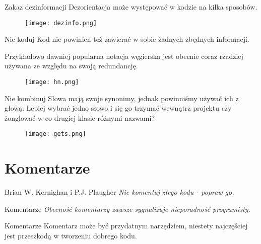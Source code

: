 \begin{frame}{Zakaz dezinformacji}
	Dezorientacja może występować w kodzie na kilka sposobów.
\end{frame}

\begin{frame}
	\begin{figure} \centering
		\texttt{[image: dezinfo.png]}
	\end{figure}
\end{frame}

\begin{frame}{Nie koduj}
	Kod nie powinien też zawierać w sobie żadnych zbędnych informacji.
	
	Przykładowo dawniej popularna notacja węgierska jest obecnie coraz rzadziej używana ze względu na swoją redundancję.
\end{frame}

\begin{frame}
	\begin{figure} \centering
		\texttt{[image: hn.png]}
	\end{figure}
\end{frame}

\begin{frame}{Nie kombinuj}
	Słowa mają swoje synonimy, jednak powinniśmy używać ich z głową. Lepiej wybrać jedno słowo i się go trzymać wewnątrz projektu czy żonglować w co drugiej klasie różnymi nazwami?
\end{frame}

\begin{frame}
	\begin{figure} \centering
		\texttt{[image: gets.png]}
	\end{figure}
\end{frame}

\section{Komentarze}

\begin{frame}{Brian W. Kernighan i P.J. Plaugher}
	\emph{Nie komentuj złego kodu - popraw go.}
\end{frame}

\begin{frame}{Komentarze}
	\emph{Obecność komentarzy zawsze sygnalizuje nieporadność programisty.}
\end{frame}

\begin{frame}{Komentarze}
	Komentarz może być przydatnym narzędziem, niestety najczęściej jest przeszkodą w tworzeniu dobrego kodu.
\end{frame}

